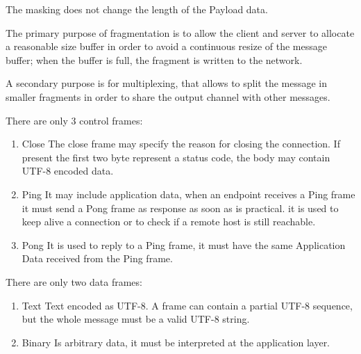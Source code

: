 The masking does not change the length of the Payload data.\newline

The primary purpose of fragmentation is to allow the client and server to allocate a reasonable size buffer in order to avoid a continuous resize of the message buffer; when the buffer is full, the fragment is written to the network.\newline

A secondary purpose is for multiplexing, that allows to split the message in smaller fragments in order to share the output channel with other messages.\newline

There are only 3 control frames:
\begin{enumerate}
	\item Close The close frame may specify the reason for closing the connection.
	If present the first two byte represent a status code, the body may contain UTF-8 encoded data.
	\item Ping
	It may include application data, when an endpoint receives a Ping frame it must send a Pong frame as response as soon as is practical.
	it is used to keep alive a connection or to check if a remote host is still reachable.
	\item Pong
	It is used to reply to a Ping frame, it must have the same Application Data received from the Ping frame.
\end{enumerate}

There are only two data frames:
\begin{enumerate}
	\item Text
	Text encoded as UTF-8.
	A frame can contain a partial UTF-8 sequence, but the whole message must be a valid UTF-8 string.
	\item Binary
	Is arbitrary data, it must be interpreted at the application layer.
\end{enumerate}

